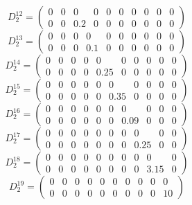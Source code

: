 \documentclass[a4paper,12pt]{article}
\begin{document}
\[
D^{12}_2 = \begin{pmatrix}
    0 & 0 & 0 & 0 & 0 & 0 & 0 & 0 & 0 & 0 \\
    0 & 0 & 0.2 & 0 & 0 & 0 & 0 & 0 & 0 & 0
\end{pmatrix}
\]
\[
D^{13}_2 = \begin{pmatrix}
    0 & 0 & 0 & 0 & 0 & 0 & 0 & 0 & 0 & 0 \\
    0 & 0 & 0 & 0.1 & 0 & 0 & 0 & 0 & 0 & 0
\end{pmatrix}
\]
\[
D^{14}_2 = \begin{pmatrix}
    0 & 0 & 0 & 0 & 0 & 0 & 0 & 0 & 0 & 0 \\
    0 & 0 & 0 & 0 & 0.25 & 0 & 0 & 0 & 0 & 0
\end{pmatrix}
\]
\[
D^{15}_2 = \begin{pmatrix}
    0 & 0 & 0 & 0 & 0 & 0 & 0 & 0 & 0 & 0 \\
    0 & 0 & 0 & 0 & 0 & 0.35 & 0 & 0 & 0 & 0
\end{pmatrix}
\]
\[
D^{16}_2 = \begin{pmatrix}
    0 & 0 & 0 & 0 & 0 & 0 & 0 & 0 & 0 & 0 \\
    0 & 0 & 0 & 0 & 0 & 0 & 0.09 & 0 & 0 & 0
\end{pmatrix}
\]
\[
D^{17}_2 = \begin{pmatrix}
    0 & 0 & 0 & 0 & 0 & 0 & 0 & 0 & 0 & 0 \\
    0 & 0 & 0 & 0 & 0 & 0 & 0 & 0.25 & 0 & 0
\end{pmatrix}
\]
\[
D^{18}_2 = \begin{pmatrix}
    0 & 0 & 0 & 0 & 0 & 0 & 0 & 0 & 0 & 0 \\
    0 & 0 & 0 & 0 & 0 & 0 & 0 & 0 & 3.15 & 0
\end{pmatrix}
\]
\[
D^{19}_2 = \begin{pmatrix}
    0 & 0 & 0 & 0 & 0 & 0 & 0 & 0 & 0 & 0 \\
    0 & 0 & 0 & 0 & 0 & 0 & 0 & 0 & 0 & 10
\end{pmatrix}
\]

\newpage
\end{document}
